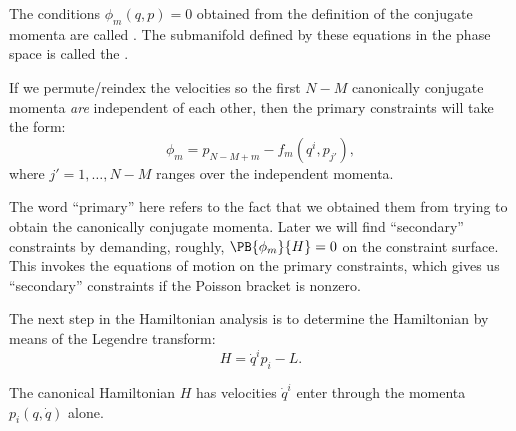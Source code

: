 \begin{definition}
The conditions $\phi_{m}(q,p)=0$ obtained from the definition of the
conjugate momenta are called .
The submanifold defined by these equations in the phase space is called
the .
\end{definition}

\begin{remark}
If we permute/reindex the velocities so the first $N-M$ canonically
conjugate momenta \emph{are} independent of each other, then the primary
constraints will take the form:
\[\phi_{m}=p_{N-M+m}-f_{m}(q^{i},p_{j'}),\]
where $j'=1,\dots,N-M$ ranges over the independent momenta.
\end{remark}

\begin{remark}
The word ``primary'' here refers to the fact that we obtained them from
trying to obtain the canonically conjugate momenta. Later we will find
``secondary'' constraints by demanding, roughly, $\PB{\phi_{m}}{H}=0$ on
the constraint surface. This invokes the equations of motion on the
primary constraints, which gives us ``secondary'' constraints if the
Poisson bracket is nonzero.
\end{remark}

The next step in the Hamiltonian analysis is to determine the
Hamiltonian by means of the Legendre transform:
\begin{equation}
H = \dot{q}^{i}p_{i} - L.
\end{equation}

\begin{lemma}
The canonical Hamiltonian $H$ has velocities $\dot{q}^{i}$ enter through
the momenta $p_{i}(q,\dot{q})$ alone.
\end{lemma}

